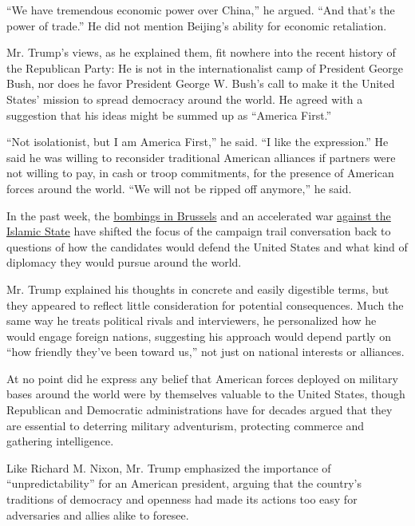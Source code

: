 ``We have tremendous economic power over China,'' he argued. ``And
that's the power of trade.'' He did not mention Beijing's ability for
economic retaliation.

Mr. Trump's views, as he explained them, fit nowhere into the recent
history of the Republican Party: He is not in the internationalist camp
of President George Bush, nor does he favor President George W. Bush's
call to make it the United States' mission to spread democracy around
the world. He agreed with a suggestion that his ideas might be summed up
as ``America First.''

``Not isolationist, but I am America First,'' he said. ``I like the
expression.'' He said he was willing to reconsider traditional American
alliances if partners were not willing to pay, in cash or troop
commitments, for the presence of American forces around the world. ``We
will not be ripped off anymore,'' he said.

In the past week, the
\href{http://www.nytimes3xbfgragh.onion/2016/03/23/world/europe/brussels-airport-explosions.html}{bombings
in Brussels} and an accelerated war
\href{http://www.nytimes3xbfgragh.onion/2016/03/26/world/middleeast/abd-al-rahman-mustafa-al-qaduli-isis-reported-killed-in-syria.html}{against
the Islamic State} have shifted the focus of the campaign trail
conversation back to questions of how the candidates would defend the
United States and what kind of diplomacy they would pursue around the
world.

Mr. Trump explained his thoughts in concrete and easily digestible
terms, but they appeared to reflect little consideration for potential
consequences. Much the same way he treats political rivals and
interviewers, he personalized how he would engage foreign nations,
suggesting his approach would depend partly on ``how friendly they've
been toward us,'' not just on national interests or alliances.

At no point did he express any belief that American forces deployed on
military bases around the world were by themselves valuable to the
United States, though Republican and Democratic administrations have for
decades argued that they are essential to deterring military
adventurism, protecting commerce and gathering intelligence.

Like Richard M. Nixon, Mr. Trump emphasized the importance of
``unpredictability'' for an American president, arguing that the
country's traditions of democracy and openness had made its actions too
easy for adversaries and allies alike to foresee.

